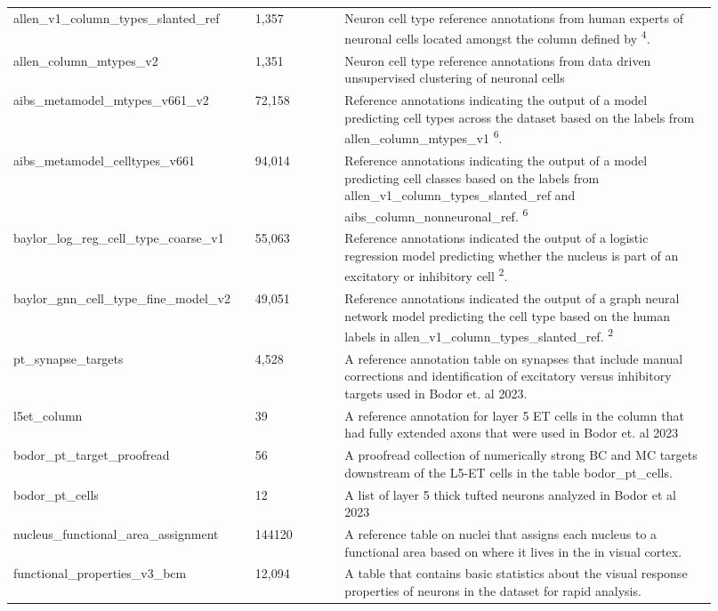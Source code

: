\documentclass{article}
\begin{document}
{\begin{longtable}{p{0.3\linewidth}p{0.12\linewidth}p{0.5\linewidth}}
allen\_v1\_column\_types\_slanted\_ref & 1,357 & Neuron cell type reference annotations from human experts of neuronal cells located amongst the column defined by \textsuperscript{4}. \\
allen\_column\_mtypes\_v2 & 1,351 & Neuron cell type reference annotations from data driven unsupervised clustering of neuronal cells \\
aibs\_metamodel\_mtypes\_v661\_v2 & 72,158 & Reference annotations indicating the output of a model predicting cell types across the dataset based on the labels from allen\_column\_mtypes\_v1 \textsuperscript{6}. \\
aibs\_metamodel\_celltypes\_v661 & 94,014 & Reference annotations indicating the output of a model predicting cell classes based on the labels from allen\_v1\_column\_types\_slanted\_ref and aibs\_column\_nonneuronal\_ref. \textsuperscript{6} \\
baylor\_log\_reg\_cell\_type\_coarse\_v1 & 55,063 & Reference annotations indicated the output of a logistic regression model predicting whether the nucleus is part of an excitatory or inhibitory cell \textsuperscript{2}. \\
baylor\_gnn\_cell\_type\_fine\_model\_v2 & 49,051 & Reference annotations indicated the output of a graph neural network model predicting the cell type based on the human labels in allen\_v1\_column\_types\_slanted\_ref. \textsuperscript{2} \\
pt\_synapse\_targets & 4,528 & A reference annotation table on synapses that include manual corrections and identification of excitatory versus inhibitory targets used in Bodor et. al 2023. \\
l5et\_column & 39 & A reference annotation for layer 5 ET cells in the column that had fully extended axons that were used in Bodor et. al 2023 \\
bodor\_pt\_target\_proofread & 56 & A proofread collection of numerically strong BC and MC targets downstream of the L5-ET cells in the table bodor\_pt\_cells. \\
bodor\_pt\_cells & 12 & A list of layer 5 thick tufted neurons analyzed in Bodor et al 2023 \\
nucleus\_functional\_area\_assignment & 144120 & A reference table on nuclei that assigns each nucleus to a functional area based on where it lives in the in visual cortex. \\
functional\_properties\_v3\_bcm & 12,094 & A table that contains basic statistics about the visual response properties of neurons in the dataset for rapid analysis. \\

\end{longtable}}
\end{document}

